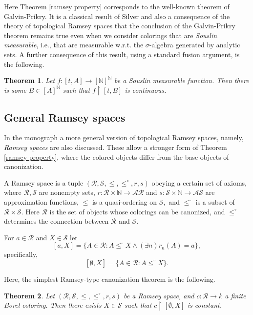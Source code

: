\documentclass[11pt]{amsart}
\newcommand{\N}{\mathbb{N}}
\renewcommand{\restriction}[2]{#1 \upharpoonright #2}
\newtheorem{theorem}{Theorem}[section]
\theoremstyle{definition}
\numberwithin{equation}{section}
\newcommand{\rstr}{\restriction}
\newcommand{\est}{\emptyset}
\newcommand{\fR}{\mathcal{R}}
\newcommand{\fS}{\mathcal{S}}
\begin{document}
	Here Theorem \ref{ramsey property} corresponds to the well-known theorem of Galvin-Prikry.
	It is a classical result of Silver and also a consequence of the theory of topological Ramsey spaces that the conclusion of the Galvin-Prikry theorem remains true even when we consider colorings that are \emph{Souslin measurable}, i.e., that are measurable w.r.t. the $\sigma$-algebra generated by analytic sets. A further consequence of this result, using a standard fusion argument, is the following.
	
	\begin{theorem}
		\label{t:function} Let $f:[t,A] \to [\N]^\N$ be a Souslin measurable function. Then there is some $B \in [A]^\N$ such that $\restriction{f}{[t,B]}$ is continuous.
	\end{theorem}
	
	
\subsection{General Ramsey spaces} \label{general ramsey}
	
	In the monograph \cite{ramseyspaces} a more general version of topological Ramsey spaces, namely, \emph{Ramsey spaces} are also discussed. These allow a stronger form of Theorem \ref{ramsey property}, where the colored objects differ from the base objects of canonization.
	
    A Ramsey space is a tuple $(\mathcal{R},\mathcal{S}, \le,\le^\circ,r,s)$ obeying a certain set of axioms, where $\mathcal{R},\mathcal{S}$ are nonempty sets, $r:\mathcal{R}\times\N\to\mathcal{AR}$ and $s:\mathcal{S}\times\N\to\mathcal{AS}$ are approximation functions, $\le$ is a quasi-ordering on $\mathcal{S},$ and $\le^\circ$ is a subset of $\mathcal{R}\times\mathcal{S}.$ Here $\mathcal{R}$ is the set of objects whose colorings can be canonized, and $\le^\circ$ determines the connection between $\mathcal{R}$ and $\mathcal{S}.$

    For $a\in\mathcal{R}$ and $X\in \mathcal{S}$ let
    $$[a,X]=\{A\in\mathcal{R}: A\le^\circ X\wedge(\exists n)r_n(A)=a\},$$
    specifically, 
    $$[\est,X]=\{A\in\mathcal{R}:A\le^\circ X\}.$$

    Here, the simplest Ramsey-type canonization theorem is the following.

    \begin{theorem}
		Let $(\fR,\fS,\le,\le^\circ,r,s)$ be a Ramsey space, and $c:\fR\to k$ a finite Borel coloring. Then there exists $X\in\fS$ such that $\rstr{c}{[\est,X]}$ is constant.
	\end{theorem}
\end{document}

